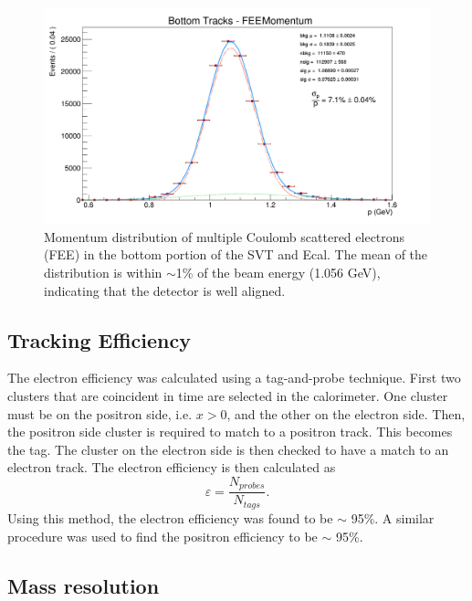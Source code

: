 \begin{figure}[h!b]
    \centering
    \includegraphics[width=.95\textwidth]{images/20160424_fee_bottom_tracks_p.png}
    \caption{Momentum distribution of multiple Coulomb scattered electrons (FEE) in
             the bottom portion of the SVT and Ecal.
             The mean of the distribution 
             is within $\sim$1\% of the beam energy (1.056 GeV), indicating that 
             the detector is well aligned.}
    \label{fig:bot_p}
\end{figure}

\subsection{Tracking Efficiency}

The electron efficiency was calculated using a tag-and-probe technique.  First
two clusters that are coincident in time are selected in the calorimeter. One
cluster must be on the positron side, i.e. $x > 0$, and the other on the electron
side.  
Then, 
the positron side cluster is required to match to a positron track.  This 
becomes the tag.  The cluster on the electron side is then checked to have a  
match to an electron track.  The electron efficiency is then calculated as 
\begin{equation}
    \varepsilon = \frac{N_{probes}}{N_{tags}}.
\end{equation}
Using this method, the electron efficiency was found to be $\sim$ 95\%. A similar
procedure was used to find the positron efficiency to be $\sim$ 95\%.

\subsection{Mass resolution} \label{sec:mass_res}

